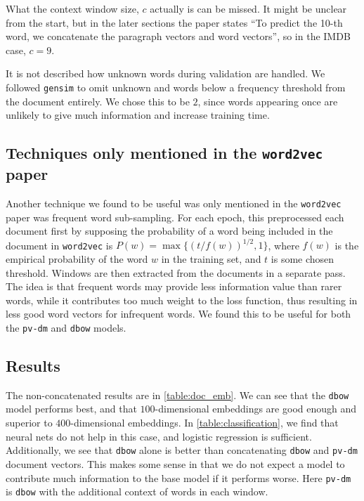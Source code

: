 \documentclass{article}
\begin{document}
What the context window size, $c$ actually is can be missed. It might be unclear from the start, but in the later sections the paper states ``To predict the 10-th word, we concatenate the paragraph vectors and word vectors'', so in the IMDB case, $c=9$.

It is not described how unknown words during validation are handled. We followed \texttt{gensim} to omit unknown and words below a frequency threshold from the document entirely. We chose this to be $2$, since words appearing once are unlikely to give much information and increase training time.

\subsection{Techniques only mentioned in the \texttt{word2vec} paper}
Another technique we found to be useful was only mentioned in the \texttt{word2vec} paper was frequent word sub-sampling. For each epoch, this preprocessed each document first by supposing the probability of a word being included in the document in \texttt{word2vec} is $P(w)=\max\{(t/f(w))^{1/2}, 1\}$, where $f(w)$ is the empirical probability of the word ${w}$ in the training set, and $t$ is some chosen threshold. Windows are then extracted from the documents in a separate pass. The idea is that frequent words may provide less information value than rarer words, while it contributes too much weight to the loss function, thus resulting in less good word vectors for infrequent words. We found this to be useful for both the \texttt{pv-dm} and \texttt{dbow} models.

\subsection{Results}
The non-concatenated results are in \autoref{table:doc_emb}. We can see that the \texttt{dbow} model performs best, and that $100$-dimensional embeddings are good enough and superior to $400$-dimensional embeddings. In \autoref{table:classification}, we find that neural nets do not help in this case, and logistic regression is sufficient. Additionally, we see that \texttt{dbow} alone is better than concatenating \texttt{dbow} and \texttt{pv-dm} document vectors. This makes some sense in that we do not expect a model to contribute much information to the base model if it performs worse. Here \texttt{pv-dm} is \texttt{dbow} with the additional context of words in each window.
\end{document}
